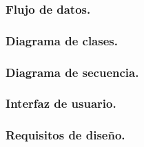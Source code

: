 \documentclass[12pt, a4paper, titlepage]{article}
\begin{document}
			\subsubsection{Flujo de datos.}
			\subsubsection{Diagrama de clases.}
			\subsubsection{Diagrama de secuencia.}
			\subsubsection{Interfaz de usuario.}
			\subsubsection{Requisitos de diseño.}
			
\end{document}
